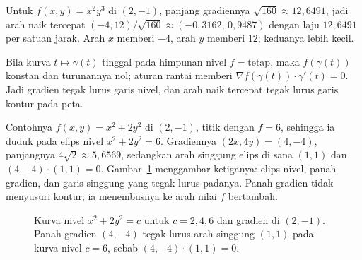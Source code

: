 Untuk $f(x,y)=x^{2}y^{3}$ di $(2,-1)$, panjang gradiennya $\sqrt{160}\approx12{,}6491$, jadi
arah naik tercepat $(-4,12)/\sqrt{160}\approx(-0{,}3162,\,0{,}9487)$ dengan laju $12{,}6491$
per satuan jarak. Arah $x$ memberi $-4$, arah $y$ memberi $12$; keduanya lebih kecil.

Bila kurva $t\mapsto\gamma(t)$ tinggal pada himpunan nivel $f=\text{tetap}$, maka
$f(\gamma(t))$ konstan dan turunannya nol; aturan rantai memberi
$\nabla f(\gamma(t))\cdot\gamma'(t)=0$. Jadi gradien tegak lurus garis nivel, dan arah naik
tercepat tegak lurus garis kontur pada peta.

Contohnya $f(x,y)=x^{2}+2y^{2}$ di $(2,-1)$, titik dengan $f=6$, sehingga ia duduk pada
elips nivel $x^{2}+2y^{2}=6$. Gradiennya $(2x,4y)=(4,-4)$, panjangnya
$4\sqrt{2}\approx5{,}6569$, sedangkan arah singgung elips di sana $(1,1)$ dan
$(4,-4)\cdot(1,1)=0$. Gambar~\ref{fig:kontur-gradien} menggambar ketiganya: elips nivel,
panah gradien, dan garis singgung yang tegak lurus padanya. Panah gradien tidak menyusuri
kontur; ia menembusnya ke arah nilai $f$ bertambah.

\begin{figure}[htbp]
\centering
{}
\caption{Kurva nivel $x^{2}+2y^{2}=c$ untuk $c=2,4,6$ dan gradien di $(2,-1)$. Panah
gradien $(4,-4)$ tegak lurus arah singgung $(1,1)$ pada kurva nivel $c=6$, sebab
$(4,-4)\cdot(1,1)=0$.}
\label{fig:kontur-gradien}
\end{figure}

